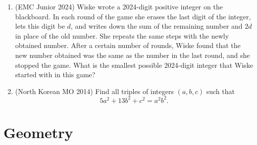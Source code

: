 \documentclass[11pt,letterpaper]{article}
\begin{document}
\begin{enumerate}[resume]
    \item (EMC Junior 2024) Wiske wrote a 2024-digit positive integer on the blackboard. In each round of the game she erases the last digit of the integer, lets this digit be $d$, and writes down the sum of the remaining number and $2d$ in place of the old number. She repeats the same steps with the newly obtained number. After a certain number of rounds, Wiske found that the new number obtained was the same as the number in the last round, and she stopped the game. What is the smallest possible 2024-digit integer that Wiske started with in this game?

    \item (North Korean MO 2014) Find all triples of integers $(a,b,c)$ such that
    \[ 5a^2+13b^2+c^2=a^2b^2. \]
\end{enumerate}

\section*{Geometry}
\end{document}
